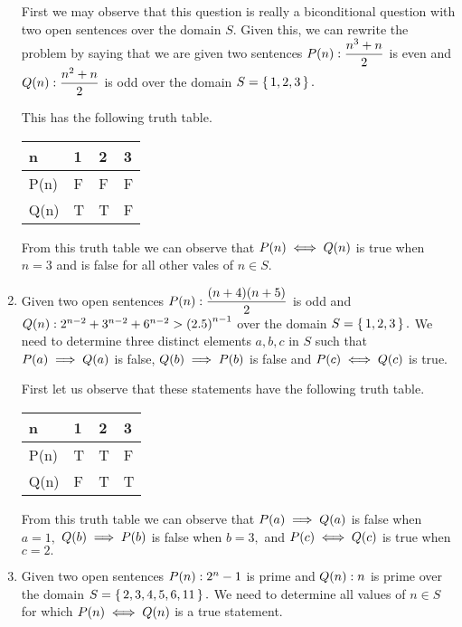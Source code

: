 \documentclass[12pt]{article}
\makeatletter
\newcommand*{\arabicodd}[1]{%
  \expandafter\@arabicodd\csname c@#1\endcsname
}
\newcommand*{\@arabicodd}[1]{%
  \@arabic{\numexpr(#1)*2-1\relax}%
}
\makeatother
\begin{document}
\begin{enumerate}[label=2.\arabicodd*, start=18]
        First we may observe that this question is really a biconditional question
        with two open sentences over the domain $S.$ Given this, we can rewrite
        the problem by saying that we are given two sentences $P\qty(n): \dfrac{n^3+n}{2}$ is even
        and $Q\qty(n): \dfrac{n^2+n}{2}$ is odd over the domain $S=\set{1,2,3}.$

        This has the following truth table.
        \hfill
        \hfill
        \linebreak
        \linebreak
        \begin{minipage}{0.4\linewidth}
          \begin{tabular}{@{}llll@{}}
            \toprule
            n    & 1 & 2 & 3 \\ \midrule
            P(n) & F & F & F \\
            Q(n) & T & T & F \\ \bottomrule
          \end{tabular}
        \end{minipage}
        \linebreak
        \linebreak
        From this truth table we can observe that $P\qty(n) \iff Q\qty(n)$
        is true when $n=3$ and is false for all other vales of $n \in S.$
  \item Given two open sentences $P\qty(n): \dfrac{\qty(n+4)\qty(n+5)}{2}$ is odd
        and $Q\qty(n): 2^{n-2} + 3^{n-2} + 6^{n-2} > \qty(2.5)^{n-1}$ over the domain $S=\set{1,2,3}.$
        We need to determine three distinct elements $a,b,c$ in $S$ such that
        $P\qty(a) \implies Q\qty(a)$ is false, $Q\qty(b) \implies P\qty(b)$ is false
        and $P\qty(c) \iff Q\qty(c)$ is true.

        First let us observe that these statements have the following truth table.
        \hfill
        \hfill
        \linebreak
        \linebreak
        \begin{minipage}{0.4\linewidth}
          \begin{tabular}{@{}llll@{}}
            \toprule
            n    & 1 & 2 & 3 \\ \midrule
            P(n) & T & T & F \\
            Q(n) & F & T & T \\ \bottomrule
          \end{tabular}
        \end{minipage}
        \linebreak
        \linebreak
        From this truth table we can observe that $P\qty(a) \implies Q\qty(a)$ is false
        when $a=1,$ $Q\qty(b) \implies P\qty(b)$ is false when $b=3,$ and
        $P\qty(c) \iff Q\qty(c)$ is true when $c=2.$
  \item Given two open sentences $P\qty(n): 2^n - 1$ is prime
        and $Q\qty(n): n$ is prime over the domain $S=\set{2,3,4,5,6,11}.$
        We need to determine all values of $n \in S$ for which $P\qty(n) \iff Q\qty(n)$
        is a true statement.


\end{enumerate}
\end{document}
